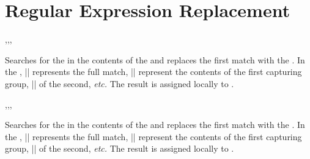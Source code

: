 \documentclass[oneside]{book}
\begin{document}
\section{Regular Expression Replacement}

\begin{function}{\regexReplaceOnce,\regexReplaceOnceT,\regexReplaceOnceT,\regexReplaceOnceTF}
\begin{syntax}
   
    
    
     
\end{syntax}
Searches for the  in the contents of the
 and replaces the first match with the
. In the ,
|\0| represents the full match, |\1| represent the contents of the
first capturing group, |\2| of the second, \emph{etc.}
The result is assigned locally to .
\end{function}

\begin{function}{\regexReplaceOnce,\regexReplaceOnceT,\regexReplaceOnceT,\regexReplaceOnceTF}
\begin{syntax}
   
    
    
     
\end{syntax}
Searches for the  in the contents of the
 and replaces the first match with the
. In the ,
|\0| represents the full match, |\1| represent the contents of the
first capturing group, |\2| of the second, \emph{etc.}
The result is assigned locally to .
\end{function}
\end{document}
